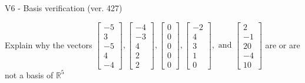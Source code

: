 \begin{exercise}
  \begin{exerciseTitle}V6 - Basis verification (ver. 427)\end{exerciseTitle}
  \begin{exerciseStatement}
    Explain why the vectors \(\left[\begin{array}{r}
-5 \\
3 \\
-5 \\
4 \\
-4
\end{array}\right] , \left[\begin{array}{r}
-4 \\
-3 \\
4 \\
2 \\
2
\end{array}\right] , \left[\begin{array}{r}
0 \\
0 \\
0 \\
0 \\
0
\end{array}\right] , \left[\begin{array}{r}
-2 \\
4 \\
3 \\
1 \\
0
\end{array}\right] , \text{ and } \left[\begin{array}{r}
2 \\
-1 \\
20 \\
-4 \\
10
\end{array}\right]\) are or are not a basis of \(\mathbb{R}^5\)	



\end{exerciseStatement}
\end{exercise}
